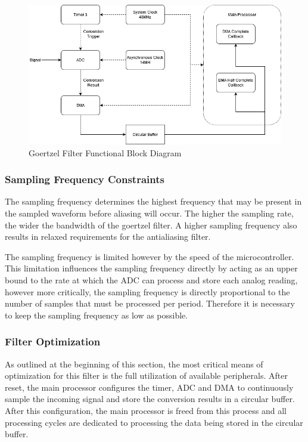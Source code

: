 \begin{figure}[H]
	\centering
	\includegraphics[width=.8\textwidth]{figures/design/goertzel_filter_functional.png}
	\caption{Goertzel Filter Functional Block Diagram}
	\label{fig:goertzel_functional_diagram}
\end{figure}

\subsubsection{Sampling Frequency Constraints}
\label{sec:sampling_frequency_constraints}
The sampling frequency determines the highest frequency that may be present in the sampled waveform before aliasing will occur. The higher the sampling rate, the wider the bandwidth of the goertzel filter. A higher sampling frequency also results in relaxed requirements for the antialiasing filter.

The sampling frequency is limited however by the speed of the microcontroller. This limitation influences the sampling frequency directly by acting as an upper bound to the rate at which the ADC can process and store each analog reading, however more critically, the sampling frequency is directly proportional to the number of samples that must be processed per period. Therefore it is necessary to keep the sampling frequency as low as possible.

\subsubsection{Filter Optimization}
\label{sec:filter_optimization_design}
As outlined at the beginning of this section, the most critical means of optimization for this filter is the full utilization of available peripherals. After reset, the main processor configures the timer, ADC and DMA to continuously sample the incoming signal and store the conversion results in a circular buffer. After this configuration, the main processor is freed from this process and all processing cycles are dedicated to processing the data being stored in the circular buffer.

